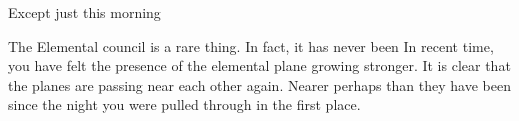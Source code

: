 \documentclass[char]{guildcamp1}
\begin{document}
Except just this morning

The Elemental council is a rare thing. In fact, it has never been  In recent time, you have felt the presence of the elemental plane growing stronger. It is clear that the planes are passing near each other again. Nearer perhaps than they have been since the night you were pulled through in the first place.

 
\end{document}
